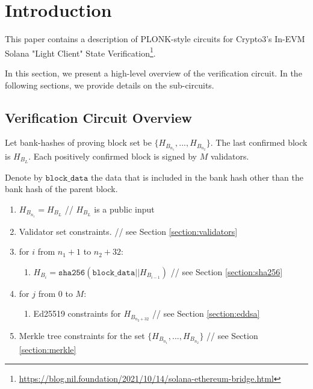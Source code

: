 \section{Introduction}
\label{section:introduction}
This paper contains a description of PLONK-style circuits for Crypto3's In-EVM Solana "Light Client" State Verification\footnote{\url{https://blog.nil.foundation/2021/10/14/solana-ethereum-bridge.html}}.

In this section, we present a high-level overview of the verification circuit. 
In the following sections, we provide details on the sub-circuits. 

\subsection{Verification Circuit Overview}

Let bank-hashes of proving block set be $\{H_{B_{n_1}}, ..., H_{B_{n_2}}\}$.
The last confirmed block is $H_{B_{L}}$.
Each positively confirmed block is signed by $M$ validators. 

Denote by $\texttt{block\_data}$ the data that is included in the bank hash other than the bank hash of the parent block.

\begin{enumerate}
	\item $H_{B_{n_1}} = H_{B_{L}}$ // $ H_{B_{L}}$ is a public input
	\item Validator set constraints. // see Section \ref{section:validators}
	\item for $i$ from $n_1 + 1$ to $n_2 + 32$:
	\begin{enumerate}
		\item $H_{B_i} = \texttt{sha256}(\texttt{block\_data} || H_{B_{i - 1}})$ // see Section \ref{section:sha256}
	\end{enumerate}
	\item for $j$ from $0$ to $M$:
	\begin{enumerate}
		\item Ed25519 constraints for $H_{B_{n_2 + 32}}$ // see Section \ref{section:eddsa}
	\end{enumerate}
	\item Merkle tree constraints for the set $\{H_{B_{n_1}}, ..., H_{B_{n_2}}\}$ // see Section \ref{section:merkle}
\end{enumerate}